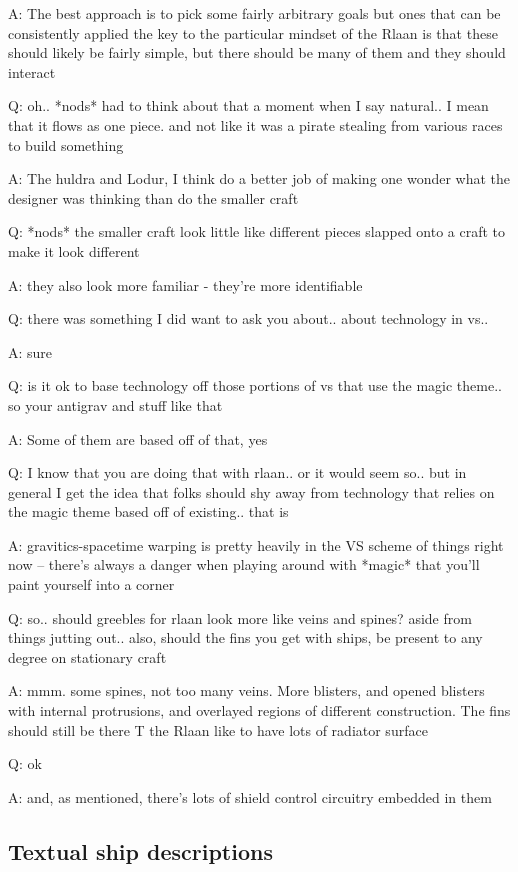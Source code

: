 A: The best approach is to pick some fairly arbitrary goals but ones
that can be consistently applied the key to the particular mindset of
the Rlaan is that these should likely be fairly simple, but there
should be many of them and they should interact

Q: oh.. *nods* had to think about that a moment when I say natural.. I
mean that it flows as one piece. and not like it was a pirate stealing
from various races to build something

A: The huldra and Lodur, I think do a better job of making one wonder
what the designer was thinking than do the smaller craft

Q: *nods* the smaller craft look little like different pieces slapped
onto a craft to make it look different

A: they also look more familiar - they're more identifiable

Q: there was something I did want to ask you about.. about technology
in vs..

A: sure

Q: is it ok to base technology off those portions of vs that use the
magic theme.. so your antigrav and stuff like that

A: Some of them are based off of that, yes

Q: I know that you are doing that with rlaan.. or it would seem
so.. but in general I get the idea that folks should shy away from
technology that relies on the magic theme based off of existing.. that
is

A: gravitics-spacetime warping is pretty heavily in the VS scheme of
things right now -- there's always a danger when playing around with
*magic* that you'll paint yourself into a corner

Q: so.. should greebles for rlaan look more like veins and spines?
aside from things jutting out..  also, should the fins you get with
ships, be present to any degree on stationary craft

A: mmm. some spines, not too many veins. More blisters, and opened
blisters with internal protrusions, and overlayed regions of different
construction.  The fins should still be there T the Rlaan like to have
lots of radiator surface

Q: ok

A: and, as mentioned, there's lots of shield control circuitry
embedded in them

\subsection{Textual ship descriptions}

